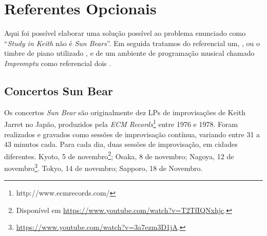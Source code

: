 




\section{Referentes Opcionais}\label{sec:sunbear}

Aqui foi possível elaborar uma solução possível ao problema enunciado como ``\emph{Study in Keith} não é \emph{Sun Bears}''. Em seguida tratamos do referencial um, , ou o timbre de piano utilizado , e de um ambiente de programação musical chamado \emph{Impromptu}  como referencial dois . 

\subsection{Concertos Sun Bear}\label{sec:sunbearanal}

Os concertos \emph{Sun Bear} são originalmente dez LPs  de improvisações de Keith Jarret no Japão, produzidos pela \emph{ECM Records}\footnote{http://www.ecmrecords.com/} entre 1976 e 1978. Foram realizados e gravados como sessões de improvisação contínua, variando entre 31 a 43 minutos cada. Para cada dia, duas sessões de improvisação, em cidades diferentes. Kyoto, 5 de novembro\footnote{Disponível em \url{https://www.youtube.com/watch?v=T2TfIQNxhjc}.}; Osaka, 8 de novembro; Nagoya, 12 de novembro\footnote{\url{https://www.youtube.com/watch?v=3a7ezm3D1jA}.}. Tokyo, 14 de novembro; Sapporo, 18 de Novembro.

